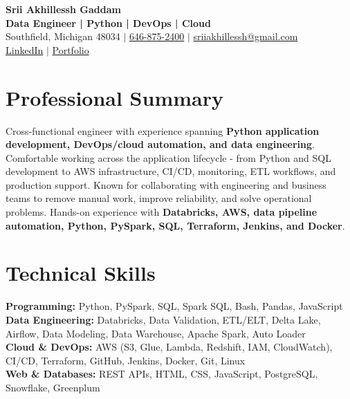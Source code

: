 \documentclass[letterpaper,10pt]{article}
\begin{document}
\fontsize{9.35pt}{10.45pt}\selectfont

\begin{center}
    {\LARGE \textbf{Srii Akhillessh Gaddam}} \\[-1pt]
    \textbf{Data Engineer | Python | DevOps | Cloud} \\[2pt]
    Southfield, Michigan 48034 $|$
    \href{tel:6468752400}{646-875-2400} $|$
    \href{mailto:sriiakhillessh@gmail.com}{sriiakhillessh@gmail.com} \\[1pt]
    \href{https://www.linkedin.com/in/srii-akhiilessh-gaddam-b48668191/}{LinkedIn} $|$
    \href{https://sriiakhillesshg.github.io/portfolio/}{Portfolio}
\end{center}
\vspace{-8pt}

\section{Professional Summary}
\small{Cross-functional engineer with experience spanning \textbf{Python application development, DevOps/cloud automation, and data engineering}. Comfortable working across the application lifecycle - from Python and SQL development to AWS infrastructure, CI/CD, monitoring, ETL workflows, and production support. Known for collaborating with engineering and business teams to remove manual work, improve reliability, and solve operational problems. Hands-on experience with \textbf{Databricks, AWS, data pipeline automation, Python, PySpark, SQL, Terraform, Jenkins, and Docker}.}

\section{Technical Skills}
\small{
\textbf{Programming:} Python, PySpark, SQL, Spark SQL, Bash, Pandas, JavaScript \\
\textbf{Data Engineering:} Databricks, Data Validation, ETL/ELT, Delta Lake, Airflow, Data Modeling, Data Warehouse, Apache Spark, Auto Loader \\
\textbf{Cloud \& DevOps:} AWS (S3, Glue, Lambda, Redshift, IAM, CloudWatch), CI/CD, Terraform, GitHub, Jenkins, Docker, Git, Linux \\
\textbf{Web \& Databases:} REST APIs, HTML, CSS, JavaScript, PostgreSQL, Snowflake, Greenplum
}
\end{document}

